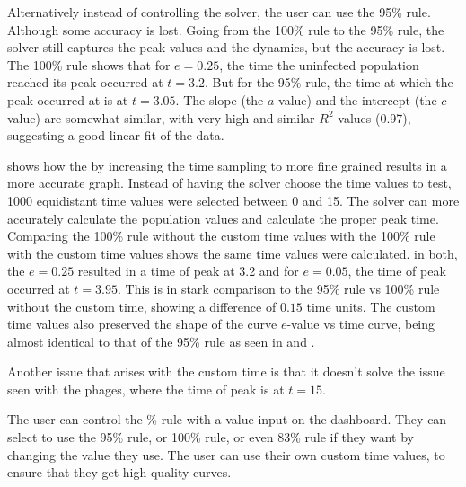 Alternatively instead of controlling the solver, the user can use the 95\% rule.
Although some accuracy is lost. 
Going from the 100\% rule to the 95\% rule, the solver still captures the peak values and the dynamics, but the accuracy is lost. 
The 100\% rule shows that for $e=0.25$, the time the uninfected population reached its peak occurred at $t=3.2$. 
But for the 95\% rule, the time at which the peak occurred at is at $t=3.05$. 
The slope (the $a$ value) and the intercept (the $c$ value) are somewhat similar, with very high and similar $R^2$ values (0.97), suggesting a good linear fit of the data. 

 shows how the by increasing the time sampling to more fine grained results in a more accurate graph. 
Instead of having the solver choose the time values to test, 1000 equidistant time values were selected between 0 and 15. 
The solver can more accurately calculate the population values and calculate the proper peak time. 
Comparing the 100\% rule without the custom time values with the 100\% rule with the custom time values shows the same time values were calculated. 
in both, the $e=0.25$ resulted in a time of peak at 3.2 and for $e=0.05$, the time of peak occurred at $t=3.95$. 
This is in stark comparison to the 95\% rule vs 100\% rule without the custom time, showing a difference of $0.15$ time units. 
The custom time values also preserved the shape of the curve $e$-value vs time curve, being almost identical to that of the 95\% rule as seen in  and . 

Another issue that arises with the custom time is that it doesn't solve the issue seen with the phages, where the time of peak is at $t=15$. 

The user can control the \% rule with a value input on the dashboard. 
They can select to use the 95\% rule, or 100\% rule, or even 83\% rule if they want by changing the value they use. 
The user can use their own custom time values, to ensure that they get high quality curves. 

